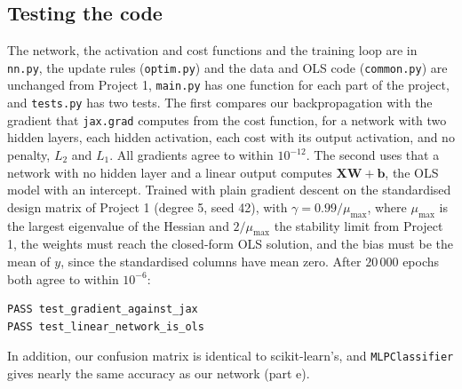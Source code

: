 \subsection*{Testing the code}

The network, the activation and cost functions and the training loop are in \texttt{nn.py}, the update rules (\texttt{optim.py}) and the data and OLS code (\texttt{common.py}) are unchanged from Project 1, \texttt{main.py} has one function for each part of the project, and \texttt{tests.py} has two tests. The first compares our backpropagation with the gradient that \texttt{jax.grad} \cite{Jax2018} computes from the cost function, for a network with two hidden layers, each hidden activation, each cost with its output activation, and no penalty, $L_2$ and $L_1$. All gradients agree to within $10^{-12}$. The second uses that a network with no hidden layer and a linear output computes $\mathbf{X}\mathbf{W} + \mathbf{b}$, the OLS model with an intercept. Trained with plain gradient descent on the standardised design matrix of Project 1 (degree 5, seed 42), with $\gamma = 0.99/\mu_{\max}$, where $\mu_{\max}$ is the largest eigenvalue of the Hessian and $2/\mu_{\max}$ the stability limit from Project 1, the weights must reach the closed-form OLS solution, and the bias must be the mean of $y$, since the standardised columns have mean zero. After $20\,000$ epochs both agree to within $10^{-6}$:

\noindent\begin{minipage}{\linewidth}
\begin{lstlisting}[style=terminal]
PASS test_gradient_against_jax
PASS test_linear_network_is_ols
\end{lstlisting}
\end{minipage}

In addition, our confusion matrix is identical to scikit-learn's, and \texttt{MLPClassifier} gives nearly the same accuracy as our network (part e).

